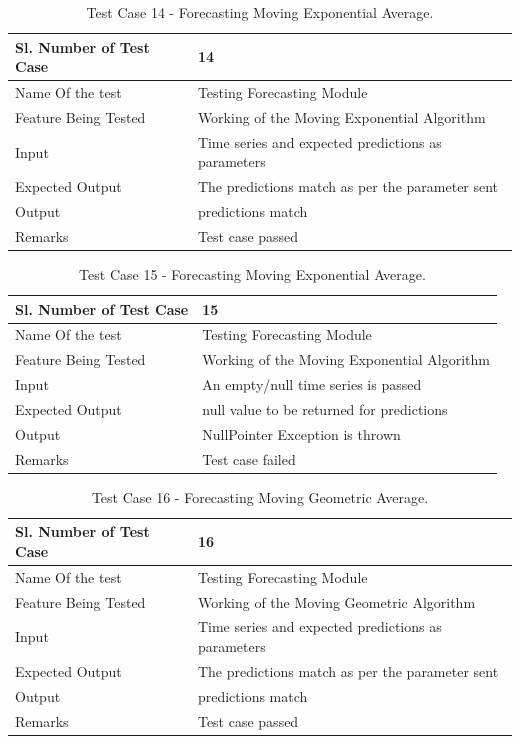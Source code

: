 \documentclass[12pt,a4paper]{report}
\begin{document}
\begin{table}
    \begin{tabular}{|l|l|}
    \hline
    Sl. Number of Test Case & 14                            \\ \hline
    Name Of the test        & Testing Forecasting Module     \\ \hline
    Feature Being Tested    & Working of the Moving Exponential Algorithm \\ \hline
    Input                   & Time series and expected predictions as parameters\\ \hline
    Expected Output         & The predictions match as per the parameter sent \\ \hline
    Output                  & predictions match \\ \hline
    Remarks                 & Test case passed              \\ \hline
    \end{tabular}
    \caption {Test Case 14 - Forecasting Moving Exponential Average.}
\end{table}
\begin{table}
    \begin{tabular}{|l|l|}
    \hline
    Sl. Number of Test Case & 15                            \\ \hline
    Name Of the test        & Testing Forecasting Module     \\ \hline
    Feature Being Tested    & Working of the Moving Exponential Algorithm \\ \hline
    Input                   & An empty/null time series is passed\\ \hline
    Expected Output         & null value to be returned for predictions \\ \hline
    Output                  & NullPointer Exception is thrown \\ \hline
    Remarks                 & Test case failed              \\ \hline
    \end{tabular}
    \caption {Test Case 15 - Forecasting Moving Exponential Average.}
\end{table}
\begin{table}
    \begin{tabular}{|l|l|}
    \hline
    Sl. Number of Test Case & 16                            \\ \hline
    Name Of the test        & Testing Forecasting Module     \\ \hline
    Feature Being Tested    & Working of the Moving Geometric Algorithm \\ \hline
    Input                   & Time series and expected predictions as parameters\\ \hline
    Expected Output         & The predictions match as per the parameter sent \\ \hline
    Output                  & predictions match \\ \hline
    Remarks                 & Test case passed              \\ \hline
    \end{tabular}
    \caption {Test Case 16 - Forecasting Moving Geometric Average.}
\end{table}
\end{document}
